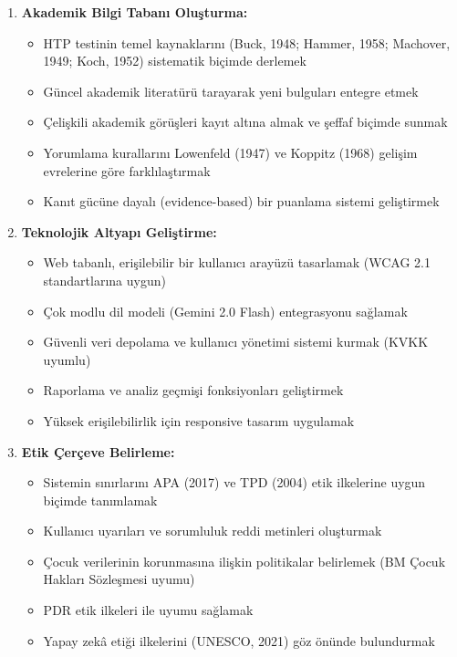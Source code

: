 \begin{enumerate}
  \item \textbf{Akademik Bilgi Tabanı Oluşturma:}
  \begin{itemize}
    \item HTP testinin temel kaynaklarını (Buck, 1948; Hammer, 1958; Machover, 1949; Koch, 1952) sistematik biçimde derlemek
    \item Güncel akademik literatürü tarayarak yeni bulguları entegre etmek
    \item Çelişkili akademik görüşleri kayıt altına almak ve şeffaf biçimde sunmak
    \item Yorumlama kurallarını Lowenfeld (1947) ve Koppitz (1968) gelişim evrelerine göre farklılaştırmak
    \item Kanıt gücüne dayalı (evidence-based) bir puanlama sistemi geliştirmek
  \end{itemize}

  \item \textbf{Teknolojik Altyapı Geliştirme:}
  \begin{itemize}
    \item Web tabanlı, erişilebilir bir kullanıcı arayüzü tasarlamak (WCAG 2.1 standartlarına uygun)
    \item Çok modlu dil modeli (Gemini 2.0 Flash) entegrasyonu sağlamak
    \item Güvenli veri depolama ve kullanıcı yönetimi sistemi kurmak (KVKK uyumlu)
    \item Raporlama ve analiz geçmişi fonksiyonları geliştirmek
    \item Yüksek erişilebilirlik için responsive tasarım uygulamak
  \end{itemize}

  \item \textbf{Etik Çerçeve Belirleme:}
  \begin{itemize}
    \item Sistemin sınırlarını APA (2017) ve TPD (2004) etik ilkelerine uygun biçimde tanımlamak
    \item Kullanıcı uyarıları ve sorumluluk reddi metinleri oluşturmak
    \item Çocuk verilerinin korunmasına ilişkin politikalar belirlemek (BM Çocuk Hakları Sözleşmesi uyumu)
    \item PDR etik ilkeleri ile uyumu sağlamak
    \item Yapay zekâ etiği ilkelerini (UNESCO, 2021) göz önünde bulundurmak
  \end{itemize}


\end{enumerate}
